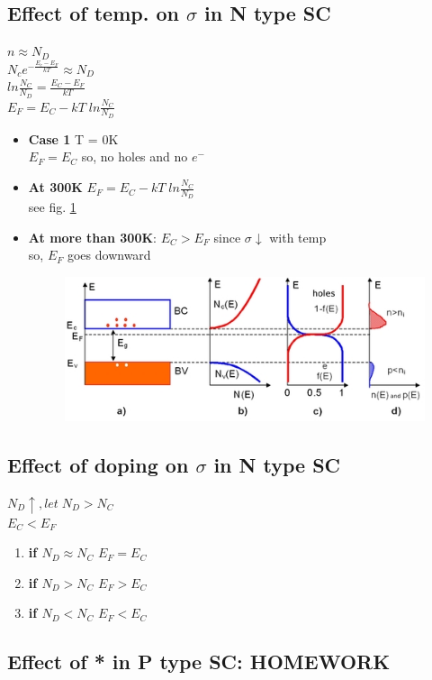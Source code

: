 \documentclass[10pt, a4paper]{report}
\begin{document}
	\subsection{Effect of temp. on $ \sigma $ in N type SC}
	$ n \approx N_D $ \\
	$ N_c  e^{-\frac{E_c-E_F}{kT}}  \approx N_D$ \\
	$ ln\frac{N_C}{N_D}  = \frac{E_C - E_F}{kT}$ \\
	$ E_F = E_C - kT\; ln \frac{N_C}{N_D} $
	\begin{itemize}
		\item \textbf{Case 1} T = 0K \\
		$ E_F = E_C $ so, no holes and no $ e^- $
		\item \textbf{At 300K} $ E_F = E_C - k T\; ln \frac{N_C}{N_D} $ \\
		see fig. \ref{fig:fermilvlntype}
		\item \textbf{At more than 300K}: $ E_C > E_F $ since $\sigma$$\downarrow$ with temp \\
		so, $ E_F $ goes downward
		\begin{figure}
			\centering
			\includegraphics[width=0.7\linewidth]{img/fermi_lvl_ntype}
			\caption{}
			\label{fig:fermilvlntype}
		\end{figure}
	\end{itemize}
	\subsection{Effect of doping on $ \sigma $ in N type SC}
	$ N_D \uparrow, let \; N_D > N_C $\\
	$ E_C < E_F $
	\begin{enumerate}
		\item \textbf{if $ N_D \approx N_C $} $ E_F = E_C $
		\item \textbf{if $ N_D > N_C $} $ E_F > E_C $
		\item \textbf{if $ N_D < N_C $} $ E_F < E_C $
	\end{enumerate}
	\subsection{Effect of * in P type SC: HOMEWORK}
\end{document}
